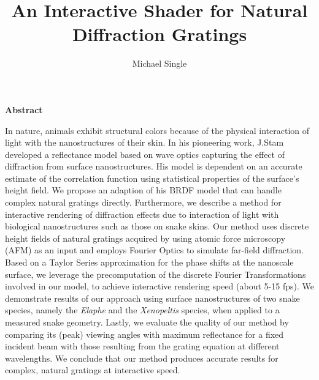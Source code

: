 \documentclass[a4paper]{report}
\begin{document}
\pagestyle{fancyplain} \thispagestyle{empty}

\title{An Interactive Shader for Natural Diffraction Gratings}
\author{Michael Single}

 \setcounter{page}{1}
\maketitle

\newpage
\thispagestyle{empty}
\vspace{8cm}
\noindent
{\centerline {\bf \large Abstract}}
\vspace{1cm}


\noindent
In nature, animals exhibit structural colors because of the physical interaction of light with the nanostructures of their skin. In his pioneering work, J.Stam developed a reflectance model based on wave optics capturing the effect of diffraction from surface nanostructures. His model is dependent on an accurate estimate of the correlation function using statistical properties of the surface's height field. We propose an adaption of his BRDF model that can handle complex natural gratings directly. Furthermore, we describe a method for interactive rendering of diffraction effects due to interaction of light with biological nanostructures such as those on snake skins. Our method uses discrete height fields of natural gratings acquired by using atomic force microscopy (AFM) as an input and employs Fourier Optics to simulate far-field diffraction. Based on a Taylor Series approximation for the phase shifts at the nanoscale surface, we leverage the precomputation of the discrete Fourier Transformations involved in our model, to achieve interactive rendering speed (about 5-15 fps). We demonstrate results of our approach using surface nanostructures of two snake species, namely the \emph{Elaphe} and the \emph{Xenopeltis} species, when applied to a measured snake geometry. Lastly, we evaluate the quality of our method by comparing its (peak) viewing angles with maximum reflectance for a fixed incident beam with those resulting from the grating equation at different wavelengths. We conclude that our method produces accurate results for complex, natural gratings at interactive speed.

 \setcounter{page}{1}
\tableofcontents

\newpage{\pagestyle{empty} \cleardoublepage}
\end{document}
